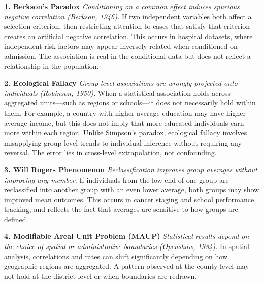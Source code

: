 \begin{tcolorbox}[
  colback=gray!2,
  colframe=gray!60,
  boxrule=0.4pt,
  width=\textwidth,
  arc=1pt,
  left=8pt,
  right=8pt,
  top=6pt,
  bottom=6pt,
  shadow={0mm}{-0.5mm}{0mm}{gray!30}
]

\textbf{1. Berkson’s Paradox}  
\emph{Conditioning on a common effect induces spurious negative correlation (Berkson, 1946).}  
If two independent variables both affect a selection criterion, then restricting attention to cases that satisfy that criterion creates an artificial negative correlation. This occurs in hospital datasets, where independent risk factors may appear inversely related when conditioned on admission. The association is real in the conditional data but does not reflect a relationship in the population.

\vspace{1em}

\textbf{2. Ecological Fallacy}  
\emph{Group-level associations are wrongly projected onto individuals (Robinson, 1950).}  
When a statistical association holds across aggregated units—such as regions or schools—it does not necessarily hold within them. For example, a country with higher average education may have higher average income, but this does not imply that more educated individuals earn more within each region. Unlike Simpson’s paradox, ecological fallacy involves misapplying group-level trends to individual inference without requiring any reversal. The error lies in cross-level extrapolation, not confounding.

\vspace{1em}

\textbf{3. Will Rogers Phenomenon}  
\emph{Reclassification improves group averages without improving any member.}  
If individuals from the low end of one group are reclassified into another group with an even lower average, both groups may show improved mean outcomes. This occurs in cancer staging and school performance tracking, and reflects the fact that averages are sensitive to how groups are defined.

\vspace{1em}

\textbf{4. Modifiable Areal Unit Problem (MAUP)}  
\emph{Statistical results depend on the choice of spatial or administrative boundaries (Openshaw, 1984).}  
In spatial analysis, correlations and rates can shift significantly depending on how geographic regions are aggregated. A pattern observed at the county level may not hold at the district level or when boundaries are redrawn.


\end{tcolorbox}
